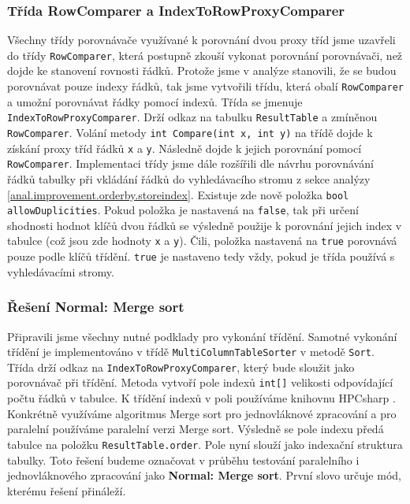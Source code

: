 \subsubsection{Třída RowComparer a IndexToRowProxyComparer}

Všechny třídy porovnávače využívané k porovnání dvou proxy tříd jsme uzavřeli do třídy \texttt{RowComparer}, která postupně zkouší vykonat porovnání porovnávači, než dojde ke stanovení rovnosti řádků.
Protože jsme v analýze stanovili, že se budou porovnávat pouze indexy řádků, tak jsme vytvořili třídu, která obalí \texttt{RowComparer} a umožní porovnávat řádky pomocí indexů. 
Třída se jmenuje \texttt{IndexToRowProxyComparer}.
Drží odkaz na tabulku \texttt{ResultTable} a zmíněnou \texttt{RowComparer}.
Volání metody \texttt{int Compare(int x, int y)} na třídě dojde k získání proxy tříd řádků \texttt{x} a \texttt{y}.
Následně dojde k jejich porovnání pomocí \texttt{RowComparer}.
Implementaci třídy jsme dále rozšířili dle návrhu porovnávání řádků tabulky při vkládání řádků do vyhledávacího stromu z sekce analýzy \ref{anal.improvement.orderby.storeindex}.
Existuje zde nově položka \texttt{bool allowDuplicities}.
Pokud položka je nastavená na \texttt{false}, tak při určení shodnosti hodnot klíčů dvou řádků se výsledně použije k porovnání jejich index v tabulce (což jsou zde hodnoty \texttt{x} a \texttt{y}).
Čili, položka nastavená na \texttt{true} porovnává pouze podle klíčů třídění.
\texttt{true} je nastaveno tedy vždy, pokud je třída používá s vyhledávacími stromy. 

\subsubsection{Řešení Normal: Merge sort}

Připravili jsme všechny nutné podklady pro vykonání třídění.
Samotné vykonání třídění je implementováno v třídě \texttt{MultiColumnTableSorter} v metodě \texttt{Sort}.
Třída drží odkaz na \texttt{IndexToRowProxyComparer}, který bude sloužit jako porovnávač při třídění.
Metoda vytvoří pole indexů \texttt{int[]} velikosti odpovídající počtu řádků v tabulce.
K třídění indexů v poli používáme knihovnu HPCsharp \citep{hpcsharp}.
Konkrétně využíváme algoritmus Merge sort pro jednovláknové zpracování a pro paralelní používáme paralelní verzi Merge sort.
Výsledně se pole indexu předá tabulce na položku \texttt{ResultTable.order}.
Pole nyní slouží jako indexační struktura tabulky.
Toto řešení budeme označovat v průběhu testování paralelního i jednovláknového zpracování jako \textbf{Normal: Merge sort}.
První slovo určuje mód, kterému řešení přináleží.

